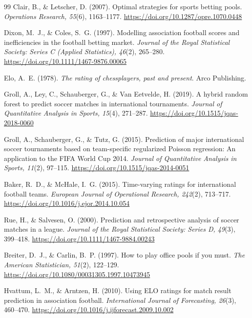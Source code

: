 \documentclass[11pt,letterpaper]{article}
\begin{document}
\begin{thebibliography}{99}
Clair, B., \& Letscher, D. (2007). Optimal strategies for sports betting pools. \emph{Operations Research, 55}(6), 1163--1177. \url{https://doi.org/10.1287/opre.1070.0448}

Dixon, M.~J., \& Coles, S.~G. (1997). Modelling association football scores and inefficiencies in the football betting market. \emph{Journal of the Royal Statistical Society: Series C (Applied Statistics), 46}(2), 265--280. \url{https://doi.org/10.1111/1467-9876.00065}

Elo, A.~E. (1978). \emph{The rating of chessplayers, past and present}. Arco Publishing.

Groll, A., Ley, C., Schauberger, G., \& Van Eetvelde, H. (2019). A hybrid random forest to predict soccer matches in international tournaments. \emph{Journal of Quantitative Analysis in Sports, 15}(4), 271--287. \url{https://doi.org/10.1515/jqas-2018-0060}

Groll, A., Schauberger, G., \& Tutz, G. (2015). Prediction of major international soccer tournaments based on team-specific regularized Poisson regression: An application to the FIFA World Cup 2014. \emph{Journal of Quantitative Analysis in Sports, 11}(2), 97--115. \url{https://doi.org/10.1515/jqas-2014-0051}

Baker, R.~D., \& McHale, I.~G. (2015). Time-varying ratings for international football teams. \emph{European Journal of Operational Research, 242}(2), 713--717. \url{https://doi.org/10.1016/j.ejor.2014.10.054}

Rue, H., \& Salvesen, O. (2000). Prediction and retrospective analysis of soccer matches in a league. \emph{Journal of the Royal Statistical Society: Series D, 49}(3), 399--418. \url{https://doi.org/10.1111/1467-9884.00243}

Breiter, D.~J., \& Carlin, B.~P. (1997). How to play office pools if you must. \emph{The American Statistician, 51}(2), 122--129. \url{https://doi.org/10.1080/00031305.1997.10473945}

Hvattum, L.~M., \& Arntzen, H. (2010). Using ELO ratings for match result prediction in association football. \emph{International Journal of Forecasting, 26}(3), 460--470. \url{https://doi.org/10.1016/j.ijforecast.2009.10.002}


\end{thebibliography}
\end{document}
